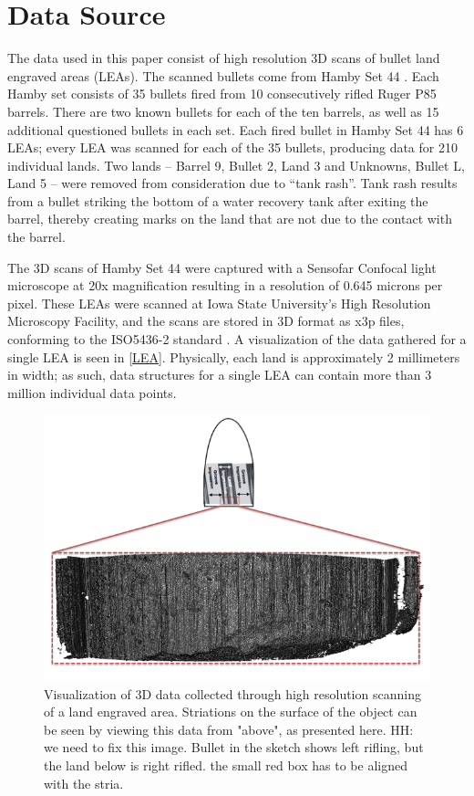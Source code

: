 \documentclass[]{article}
\begin{document}
\section{Data Source}

The data used in this paper consist of high resolution 3D scans of
bullet land engraved areas (LEAs). The scanned bullets come from Hamby
Set 44 \citep{Hamby}. Each Hamby set consists of 35 bullets fired from
10 consecutively rifled Ruger P85 barrels. There are two known bullets
for each of the ten barrels, as well as 15 additional questioned bullets
in each set. Each fired bullet in Hamby Set 44 has 6 LEAs; every LEA was
scanned for each of the 35 bullets, producing data for 210 individual
lands. Two lands -- Barrel 9, Bullet 2, Land 3 and Unknowns, Bullet L,
Land 5 -- were removed from consideration due to ``tank rash''. Tank
rash results from a bullet striking the bottom of a water recovery tank
after exiting the barrel, thereby creating marks on the land that are
not due to the contact with the barrel.

The 3D scans of Hamby Set 44 were captured with a Sensofar Confocal
light microscope at 20x magnification resulting in a resolution of 0.645
microns per pixel. These LEAs were scanned at Iowa State University's
High Resolution Microscopy Facility, and the scans are stored in 3D
format as x3p files, conforming to the ISO5436-2 standard
\citep{ISO5436}. A visualization of the data gathered for a single LEA
is seen in \autoref{LEA}. Physically, each land is approximately 2
millimeters in width; as such, data structures for a single LEA can
contain more than 3 million individual data points.

\begin{figure}
\includegraphics[width=\textwidth]{./images/3d_plot_top_context} \caption{Visualization of 3D data collected through high resolution scanning of a land engraved area. Striations on the surface of the object can be seen by viewing this data from "above", as presented here. HH: we need to fix this image. Bullet in the sketch shows left rifling, but the land below is right rifled. the small red box has to be aligned with the stria. }\label{fig:LEA}
\end{figure}
\end{document}
